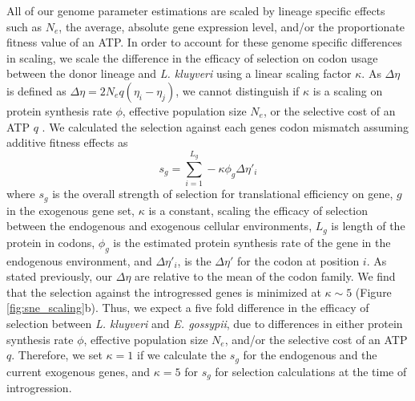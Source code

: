 \documentclass[doublespacing,linenumbers]{bmcart-modified}
\newcommand{\kluyveri}{\textit{L. kluyveri}\xspace}
\newcommand{\gossypii}{\textit{E. gossypii}\xspace}
\newcommand{\DE}{\ensuremath{{\Delta \eta}}\xspace}
\newcommand{\Ne}{\ensuremath{N_e}\xspace}
\begin{document}
All of our genome parameter estimations are scaled by lineage specific effects such as \Ne, the average, absolute gene expression level, and/or the proportionate fitness value of an ATP.
In order to account for these genome specific differences in scaling, we scale the difference in the efficacy of selection on codon usage between the donor lineage and \kluyveri using a linear scaling factor $\kappa$.
As \DE is defined as $\DE = 2\Ne q(\eta_i-\eta_j)$, we cannot distinguish if $\kappa$ is a scaling on protein synthesis rate $\phi$, effective population size $\Ne$, or the selective cost of an ATP $q$ \citep{gilchrist2007, gilchrist2015}.
We calculated the selection against each genes codon mismatch assuming additive fitness effects as 
\begin{equation}
s_g = \sum_{i=1}^{L_g} -\kappa \phi_g \DE'_i
\label{equ:sg}
\end{equation}
where $s_g$ is the overall strength of selection for translational efficiency on gene, $g$  in the exogenous gene set, $\kappa$ is a constant, scaling the efficacy of selection between the endogenous and exogenous cellular environments, $L_{g}$ is length of the protein in codons, $\phi_g$ is the estimated protein synthesis rate of the gene in the endogenous environment, and $\DE'_i$, is the $\DE'$ for the codon at position $i$.
As stated previously, our \DE are relative to the mean of the codon family.
We find that the selection against the introgressed genes is minimized at $\kappa \sim 5$ (Figure \ref{fig:sne_scaling}b).
Thus, we expect a five fold difference in the efficacy of selection between \kluyveri and \gossypii, due to differences in either protein synthesis rate $\phi$, effective population size $\Ne$, and/or the selective cost of an ATP $q$.
Therefore, we set $\kappa = 1$ if we calculate the $s_g$ for the endogenous and the current exogenous genes, and $\kappa = 5$ for $s_g$ for selection calculations at the time of introgression.
\end{document}
